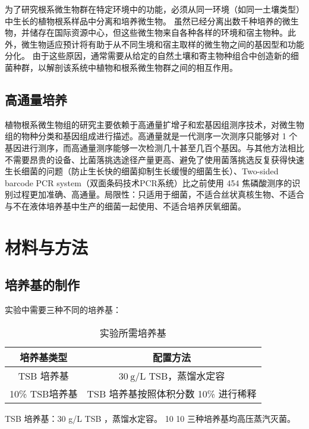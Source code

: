 \documentclass{ctexart}
\begin{document}
    \qquad 为了研究根系微生物群在特定环境中的功能，必须从同一环境（如同一土壤类型）中生长的植物根系样品中分离和培养微生物。 虽然已经分离出数千种培养的微生物，并储存在国际资源中心，但这些微生物来自各种各样的环境和宿主物种。此外，微生物适应预计将有助于从不同生境和宿主取样的微生物之间的基因型和功能分化。 由于这些原因，通常需要从给定的自然土壤和寄主物种组合中创造新的细菌种群，以解剖该系统中植物和根系微生物群之间的相互作用。


    \subsection{高通量培养}

    \qquad 植物根系微生物组的研究主要依赖于高通量扩增子和宏基因组测序技术，对微生物组的物种分类和基因组成进行描述。高通量就是一代测序一次测序只能够对 1 个基因进行测序，而高通量测序能够一次检测几十甚至几百个基因。与其他方法相比不需要昂贵的设备、比菌落挑选途径产量更高、避免了使用菌落挑选反复获得快速生长细菌的问题（防止生长快的细菌抑制生长缓慢的细菌生长）、Two-sided barcode PCR system（双面条码技术PCR系统）比之前使用 454 焦磷酸测序的识别过程更加准确、高通量。局限性：只适用于细菌，不适合丝状真核生物、不适合与不在液体培养基中生产的细菌一起使用、不适合培养厌氧细菌。

    \section{材料与方法}

    \subsection{培养基的制作}

        实验中需要三种不同的培养基：

    \begin{table}[htb]
        \caption{实验所需培养基}
        \centering
        \begin{tabular}{cc}
            \toprule
            培养基类型 & 配置方法\\
            \midrule
            TSB 培养基 & $\mathrm{30~g/L}$ TSB，蒸馏水定容\\
            10\% TSB培养基 & TSB 培养基按照体积分数 10\% 进行稀释\\
            \bottomrule
        \end{tabular}
        
    \end{table}

        

    TSB 培养基：30 g/L TSB ，蒸馏水定容。
    10%
    10%
    三种培养基均高压蒸汽灭菌。
\end{document}
